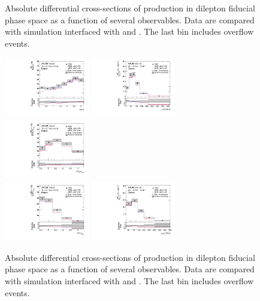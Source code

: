 \begin{figure}[ht]
  \caption{Absolute differential cross-sections of \tty production in dilepton fiducial phase space as a function of several observables. Data are compared with \madgraph simulation interfaced with \pythia and \herwig. The last bin includes overflow events.}
  \label{fig:pt_unfolded_dilep_dist_realdata_1}
\end{figure}

\begin{figure}[ht]
  \centering
  \includegraphics[width=0.33\textwidth]{figures/diff_xsec/absolute-unfolded-distributions/tty_prod_dilep/DL_tty_prod_dPhill_unfolded_absolute.pdf}%
  \includegraphics[width=0.33\textwidth]{figures/diff_xsec/absolute-unfolded-distributions/tty_prod_dilep/DL_tty_prod_ptll_unfolded_absolute.pdf}%
  \includegraphics[width=0.33\textwidth]{figures/diff_xsec/absolute-unfolded-distributions/tty_prod_dilep/DL_tty_prod_drphb_unfolded_absolute.pdf}\\
  \includegraphics[width=0.33\textwidth]{figures/diff_xsec/absolute-unfolded-distributions/tty_prod_dilep/DL_tty_prod_drlj_unfolded_absolute.pdf}%
  \includegraphics[width=0.33\textwidth]{figures/diff_xsec/absolute-unfolded-distributions/tty_prod_dilep/DL_tty_prod_ptj1_unfolded_absolute.pdf}%
  \caption{Absolute differential cross-sections of \tty production in dilepton fiducial phase space as a function of several observables. Data are compared with \madgraph simulation interfaced with \pythia and \herwig. The last bin includes overflow events.}
  \label{fig:pt_unfolded_dilep_dist_realdata_2}
\end{figure}

